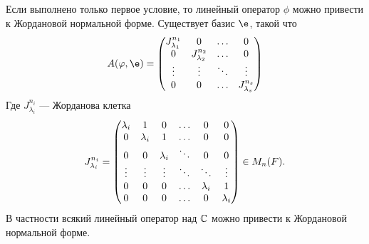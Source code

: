 \begin{Note}
  Если выполнено только первое условие, то линейный оператор $\phi$ можно привести к Жордановой нормальной форме. Существует базис $\e$, такой что
  \begin{gather*}
    A(\phi, \e) = 
    \begin{pmatrix*}
      J_{\lambda_1}^{n_1} & 0 & \ldots & 0 \\
      0 & J_{\lambda_2}^{n_2} & \ldots & 0 \\
      \vdots & \vdots & \ddots & \vdots \\
      0 & 0 & \ldots & J_{\lambda_s}^{n_s}
    \end{pmatrix*}
  \end{gather*}
  Где $J_{\lambda_i}^{n_i}$ --- Жорданова клетка
  \begin{gather*}
    J_{\lambda_i}^{n_i} = 
    \begin{pmatrix}
      \lambda_i & 1 & 0 & \ldots & 0 & 0 \\
      0 & \lambda_i & 1 & \ldots & 0 & 0 \\
      0 & 0 & \lambda_i & \ddots & 0 & 0 \\
      \vdots & \vdots & \vdots & \ddots & \ddots & \vdots \\
      0 & 0 & 0 & \ldots & \lambda_i & 1 \\
      0 & 0 & 0 & \ldots & 0 & \lambda_i
    \end{pmatrix} \in M_n(F).
  \end{gather*}
  В частности всякий линейный оператор над $\mathbb{C}$ можно привести к Жордановой нормальной форме.
\end{Note}

